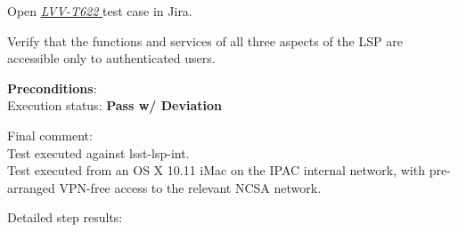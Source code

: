\documentclass[DM,lsstdraft,STR,toc]{lsstdoc}
\begin{document}
Open  \href{https://jira.lsstcorp.org/secure/Tests.jspa#/testCase/LVV-T622}{\textit{ LVV-T622 } }
test case in Jira.

    Verify that the functions and services of all three aspects of the LSP
are accessible only to authenticated users.


    \textbf{ Preconditions}:\\
    

    Execution status: {\bf Pass w/ Deviation }

    Final comment:\\Test executed against lsst-lsp-int. ~\\
Test executed from an OS X 10.11 iMac on the IPAC internal network, with
pre-arranged VPN-free access to the relevant NCSA network.



    Detailed step results:
\end{document}
